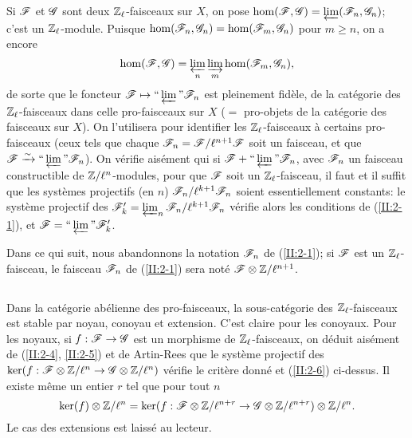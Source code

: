 Si $\mathscr{F}$ et $\mathscr{G}$ sont deux $\mathbb{Z}_\ell$-faisceaux sur $X$, on pose 
$\hom(\mathscr{F},\mathscr{G}) = \varprojlim(\mathscr{F}_n,\mathscr{G}_n)$; c'est un $\mathbb{Z}_\ell$-module. 
Puisque $\hom(\mathscr{F}_n,\mathscr{G}_n) = \hom(\mathscr{F}_m,\mathscr{G}_n)$ pour $m\geqslant n$, on a 
encore 
\[
  \hom(\mathscr{F},\mathscr{G}) = \varprojlim_n \varinjlim_m \hom(\mathscr{F}_m,\mathscr{G}_n) \text{,}
\]
de sorte que le foncteur $\mathscr{F}\mapsto \text{``}\varprojlim\text{''}\mathscr{F}_n$ est 
pleinement fidèle, de la catégorie des $\mathbb{Z}_\ell$-faisceaux dans celle 
pro-faisceaux sur $X$ ($=$ pro-objets de la catégorie des faisceaux sur $X$). 
On l'utilisera pour identifier les $\mathbb{Z}_\ell$-faisceaux à certains 
pro-faisceaux (ceux tels que chaque $\mathscr{F}_n=\mathscr{F}/\ell^{n+1}\mathscr{F}$ soit un faisceau, 
et que $\mathscr{F}\xrightarrow\sim \text{``}\varprojlim\text{''}\mathscr{F}_n$). On vérifie aisément 
qui si $\mathscr{F}+\text{``}\varprojlim\text{''}\mathscr{F}_n$, avec $\mathscr{F}_n$ un faisceau 
constructible de $\mathbb{Z}/\ell^n$-modules, pour que $\mathscr{F}$ soit un 
$\mathbb{Z}_\ell$-faisceau, il faut et il suffit que les systèmes projectifs (en $n$) 
$\mathscr{F}_n/\ell^{k+1}\mathscr{F}_n$ soient essentiellement constants: le système 
projectif des $\mathscr{F}_k'=\varprojlim_n\mathscr{F}_n/\ell^{k+1}\mathscr{F}_n$ vérifie alors les 
conditions de (\ref{II:2-1}), et $\mathscr{F}=\text{``}\varprojlim\text{''}\mathscr{F}_k'$. 

Dans ce qui suit, nous abandonnons la notation $\mathscr{F}_n$ de (\ref{II:2-1}); si 
$\mathscr{F}$ est un $\mathbb{Z}_\ell$-faisceau, le faisceau $\mathscr{F}_n$ de (\ref{II:2-1}) sera 
noté $\mathscr{F}\otimes\mathbb{Z}/\ell^{n+1}$. 





\subsection{}\label{II:2-7}

Dans la catégorie abélienne des pro-faisceaux, la sous-catégorie des 
$\mathbb{Z}_\ell$-faisceaux est stable par noyau, conoyau et extension. C'est claire 
pour les conoyaux. Pour les noyaux, si $f:\mathscr{F}\to\mathscr{G}$ est un morphisme de 
$\mathbb{Z}_\ell$-faisceaux, on déduit aisément de (\ref{II:2-4}, \ref{II:2-5}) 
et de Artin-Rees que le système projectif des 
$\ker(f:\mathscr{F}\otimes\mathbb{Z}/\ell^n\to\mathscr{G}\otimes\mathbb{Z}/\ell^n)$ vérifie le critère 
donné et (\ref{II:2-6}) ci-dessus. Il existe même un entier $r$ tel que pour 
tout $n$ 
\[
  \ker(f)\otimes\mathbb{Z}/\ell^n = \ker(f:\mathscr{F}\otimes\mathbb{Z}/\ell^{n+r}\to\mathscr{G}\otimes\mathbb{Z}/\ell^{n+r})\otimes\mathbb{Z}/\ell^n \text{.}
\]
Le cas des extensions est laissé au lecteur. 





\subsection{}\label{II:2-8}

